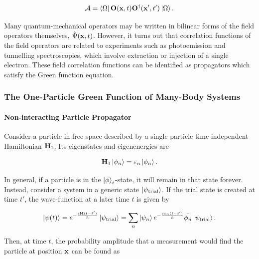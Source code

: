 \documentclass{homework}
\begin{document}
$$
    \mathcal{A} = \bra{\Omega} {{\bf O}}({{\bf x}}, t) {{\bf O}}^\dagger({{\bf x}}', t') \ket{\Omega}.
$$

Many quantum-mechanical operators may be written in bilinear forms of the field operators themselves, $\hat{\Psi}({{\bf x}}, t)$. However, it turns out that correlation functions of the field operators are related to experiments such as photoemission and tunnelling spectroscopies, which involve extraction or injection of a single electron. These field correlation functions can be identified as propagators which satisfy the Green function equation. \\

\subsubsection{The One-Particle Green Function of Many-Body Systems}

\paragraph{Non-interacting Particle Propagator}

Consider a particle in free space described by a single-particle time-independent Hamiltonian ${\bf H}_1$. Its eigenstates and eigenenergies are 

$$
    {\bf H}_1 \ket{\phi_n} = \varepsilon_n \ket{\phi_n}.
$$

In general, if a particle is in the $\ket{\phi}_i$-state, it will remain in that state forever. Instead, consider a system in a generic state $\ket{\psi_{\textnormal{trial}}}$. If the trial state is created at time $t'$, the wave-function at a later time $t$ is given by 

$$
    \ket{\psi(t)} = e^{-\frac{i {\bf H} (t-t')}{\hbar}} \ket{\psi_{\textnormal{trial}}} = \sum_{n} \ket{\psi_n} e^{-\frac{i \varepsilon_n (t-t')}{\hbar}} \bar{\phi_n}\ket{\psi_{\textnormal{trial}}}.
$$

Then, at time $t$, the probability amplitude that a measurement would find the particle at position ${\bf x}$ can be found as
\end{document}
